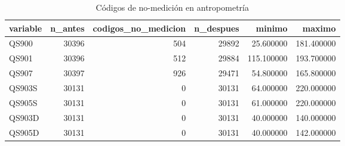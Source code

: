 \begin{table}[htbp]
\caption{Códigos de no-medición en antropometría}
\label{tab:tabla_03c_limpieza_antropometria}
\begin{tabular}{lrrrrr}
\toprule
variable & n\_antes & codigos\_no\_medicion & n\_despues & minimo & maximo \\
\midrule
QS900 & 30396 & 504 & 29892 & 25.600000 & 181.400000 \\
QS901 & 30396 & 512 & 29884 & 115.100000 & 193.700000 \\
QS907 & 30397 & 926 & 29471 & 54.800000 & 165.800000 \\
QS903S & 30131 & 0 & 30131 & 64.000000 & 220.000000 \\
QS905S & 30131 & 0 & 30131 & 61.000000 & 220.000000 \\
QS903D & 30131 & 0 & 30131 & 40.000000 & 140.000000 \\
QS905D & 30131 & 0 & 30131 & 40.000000 & 142.000000 \\
\bottomrule
\end{tabular}
\end{table}
